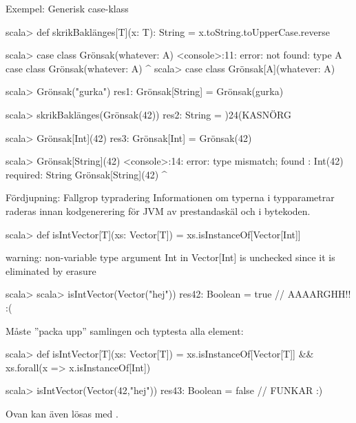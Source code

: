 \begin{Slide}{Exempel: Generisk case-klass}
\vspace{-0.5em}\begin{REPL}
scala> def skrikBaklänges[T](x: T): String = x.toString.toUpperCase.reverse

scala> case class Grönsak(whatever: A)
<console>:11: error: not found: type A
       case class Grönsak(whatever: A)
                                    ^
scala> case class Grönsak[A](whatever: A)

scala> Grönsak("gurka")
res1: Grönsak[String] = Grönsak(gurka)

scala> skrikBaklänges(Grönsak(42))
res2: String = )24(KASNÖRG

scala> Grönsak[Int](42)
res3: Grönsak[Int] = Grönsak(42)

scala> Grönsak[String](42)
<console>:14: error: type mismatch;
 found   : Int(42)
 required: String
       Grönsak[String](42)
                       ^
\end{REPL}
\end{Slide}




\ifkompendium\else


\begin{Slide}{Fördjupning: Fallgrop typradering }\SlideFontSmall
Informationen om typerna i typparametrar raderas innan kodgenerering för JVM av prestandaskäl och  i bytekoden.
\vspace{-0.25em}\begin{REPL}
scala> def isIntVector[T](xs: Vector[T]) = xs.isInstanceOf[Vector[Int]]

warning: non-variable type argument Int in Vector[Int]
is unchecked since it is eliminated by erasure

scala> scala> isIntVector(Vector("hej"))
res42: Boolean = true  // AAAARGHH!! :(
\end{REPL}
Måste ''packa upp'' samlingen och typtesta alla element:
\begin{REPL}
scala> def isIntVector[T](xs: Vector[T]) =
         xs.isInstanceOf[Vector[T]] && xs.forall(x => x.isInstanceOf[Int])

scala> isIntVector(Vector(42,"hej"))
res43: Boolean = false  // FUNKAR :)

\end{REPL}
Ovan kan även lösas med .

\end{Slide}



